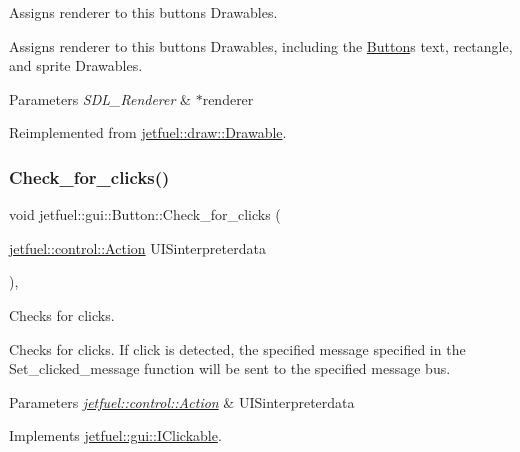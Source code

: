 Assigns renderer to this button\textquotesingle{}s Drawables. 

Assigns renderer to this button\textquotesingle{}s Drawables, including the \hyperlink{classjetfuel_1_1gui_1_1Button}{Button}\textquotesingle{}s text, rectangle, and sprite Drawables.


\begin{DoxyParams}{Parameters}
{\em S\+D\+L\+\_\+\+Renderer} & $\ast$renderer \\
\hline
\end{DoxyParams}


Reimplemented from \hyperlink{classjetfuel_1_1draw_1_1Drawable_a0d7257f197d6ffcdd89c3a99c93d1400}{jetfuel\+::draw\+::\+Drawable}.

\mbox{\label{classjetfuel_1_1gui_1_1Button_ab80239583f2e515370a90771976c5265}} 
\subsubsection{\texorpdfstring{Check\+\_\+for\+\_\+clicks()}{Check\_for\_clicks()}}
{\footnotesize\ttfamily void jetfuel\+::gui\+::\+Button\+::\+Check\+\_\+for\+\_\+clicks (\begin{DoxyParamCaption}\item[{\hyperlink{structjetfuel_1_1control_1_1Action}{jetfuel\+::control\+::\+Action}}]{U\+I\+Sinterpreterdata }\end{DoxyParamCaption})\hspace{0.3cm}{\ttfamily [override]}, {\ttfamily [virtual]}}



Checks for clicks. 

Checks for clicks. If click is detected, the specified message specified in the Set\+\_\+clicked\+\_\+message function will be sent to the specified message bus.


\begin{DoxyParams}{Parameters}
{\em \hyperlink{structjetfuel_1_1control_1_1Action}{jetfuel\+::control\+::\+Action}} & U\+I\+Sinterpreterdata \\
\hline
\end{DoxyParams}


Implements \hyperlink{classjetfuel_1_1gui_1_1IClickable_aea45de37bd3beb7eb7e2e3056e4e37b3}{jetfuel\+::gui\+::\+I\+Clickable}.

